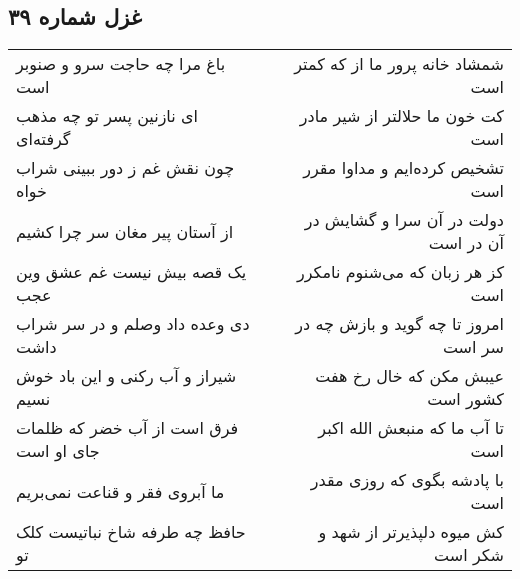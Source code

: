 \begin{center}
\section*{غزل شماره ۳۹}
\label{sec:sh039}
\begin{longtable}{l p{0.5cm} r}
باغ مرا چه حاجت سرو و صنوبر است
&&
شمشاد خانه پرور ما از که کمتر است
\\
ای نازنین پسر تو چه مذهب گرفته‌ای
&&
کت خون ما حلالتر از شیر مادر است
\\
چون نقش غم ز دور ببینی شراب خواه
&&
تشخیص کرده‌ایم و مداوا مقرر است
\\
از آستان پیر مغان سر چرا کشیم
&&
دولت در آن سرا و گشایش در آن در است
\\
یک قصه بیش نیست غم عشق وین عجب
&&
کز هر زبان که می‌شنوم نامکرر است
\\
دی وعده داد وصلم و در سر شراب داشت
&&
امروز تا چه گوید و بازش چه در سر است
\\
شیراز و آب رکنی و این باد خوش نسیم
&&
عیبش مکن که خال رخ هفت کشور است
\\
فرق است از آب خضر که ظلمات جای او است
&&
تا آب ما که منبعش الله اکبر است
\\
ما آبروی فقر و قناعت نمی‌بریم
&&
با پادشه بگوی که روزی مقدر است
\\
حافظ چه طرفه شاخ نباتیست کلک تو
&&
کش میوه دلپذیرتر از شهد و شکر است
\\
\end{longtable}
\end{center}
